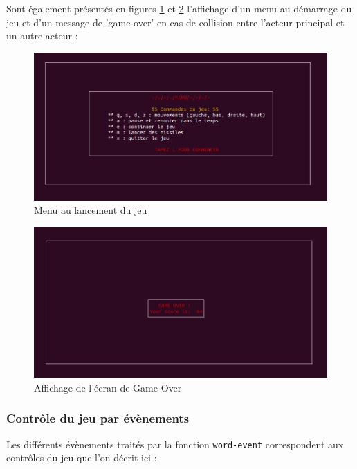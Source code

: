 \documentclass[a4paper,10pt]{article}
\begin{document}
\newpage
Sont également présentés en figures \ref{menu} et \ref{gameover} l'affichage d'un menu au démarrage du jeu et d'un message de 'game over' en cas de collision entre l'acteur principal et un autre acteur : 
\hfill
\newline
\begin{figure}[h]
\begin{center}
    \includegraphics[scale=0.5]{menu.png}%
        \caption{Menu au lancement du jeu}
    \label{menu}
\end{center}
\end{figure}
  \hfill
\begin{figure}[h]
\begin{center}
    \includegraphics[scale=0.5]{game-over.png}
        \caption{Affichage de l'écran de Game Over}
    \label{gameover}
\end{center}    
\end{figure}
\newpage

\subsubsection{Contrôle du jeu par évènements}
Les différents évènements traités par la fonction \texttt{word-event} correspondent aux contrôles du jeu que l'on décrit ici : \\
\end{document}
